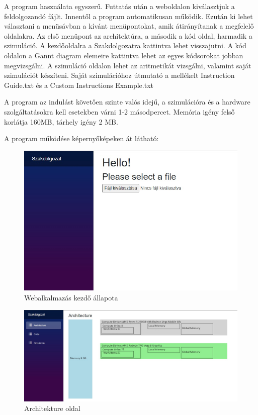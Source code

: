 
A program használata egyszerű. Futtatás után a weboldalon kiválasztjuk a feldolgozandó fájlt. Innentől a program automatikusan működik. Ezután ki lehet választani a menüsávban a kívánt menüpontokat, amik átirányítanak a megfelelő oldalakra. Az első menüpont az architektúra, a második a kód oldal, harmadik a szimuláció. A kezdőoldalra a Szakdolgozatra kattintva lehet visszajutni. A kód oldalon a Gannt diagram elemeire kattintva lehet az egyes kódsorokat jobban megvizsgálni. A szimuláció oldalon lehet az aritmetikát vizsgálni, valamint saját szimulációt készíteni. Saját szimulációhoz útmutató a mellékelt Instruction Guide.txt és a Custom Instructions Example.txt

A program az indulást követően szinte valós idejű, a szimulációra és a hardware szolgáltatásokra kell esetekben várni 1-2 másodpercet. Memória igény felső korlátja 160MB, tárhely igény 2 MB.

A program működése képernyőképeken át látható:

\begin{figure}[h]
\centering
\includegraphics[scale=0.7]{images/Start.jpg}
\caption{Webalkalmazás kezdő állapota}
\label{fig:start}
\end{figure}

\begin{figure}[h]
\centering
\includegraphics[scale=0.3]{images/Architecture.jpg}
\caption{Architekture oldal}
\label{fig:arch}
\end{figure}

